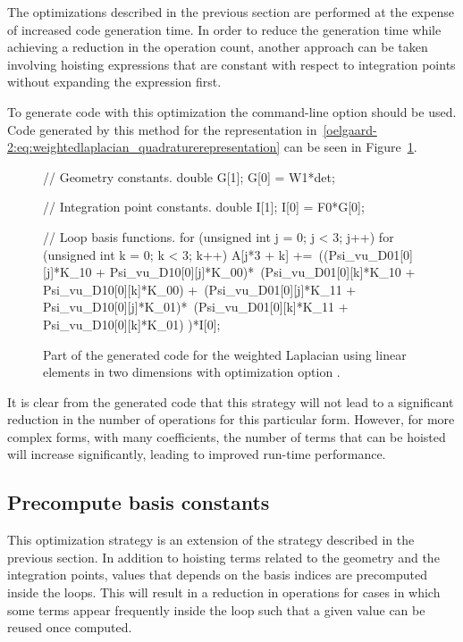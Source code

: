The optimizations described in the previous section are performed at
the expense of increased code generation time.  In order to reduce the
generation time while achieving a reduction in the operation count,
another approach can be taken involving hoisting expressions that are
constant with respect to integration points without expanding the
expression first.

To generate code with this optimization the \ffc{} command-line option
 should be used.  Code generated by this
method for the representation
in~\eqref{oelgaard-2:eq:weightedlaplacian_quadraturerepresentation}
can be seen in Figure~\ref{oelgaard-2:fig:O_ip_code}.

\begin{figure}
\begin{c++}
// Geometry constants.
double G[1];
G[0] = W1*det;

// Integration point constants.
double I[1];
I[0] = F0*G[0];

// Loop basis functions.
for (unsigned int j = 0; j < 3; j++)
{
  for (unsigned int k = 0; k < 3; k++)
  {
    A[j*3 + k] +=\
    ((Psi_vu_D01[0][j]*K_10 + Psi_vu_D10[0][j]*K_00)*\
     (Psi_vu_D01[0][k]*K_10 + Psi_vu_D10[0][k]*K_00) +\
     (Psi_vu_D01[0][j]*K_11 + Psi_vu_D10[0][j]*K_01)*\
     (Psi_vu_D01[0][k]*K_11 + Psi_vu_D10[0][k]*K_01)
    )*I[0];
  }
}
\end{c++}
\caption{Part of the generated code for the weighted Laplacian using
  linear elements in two dimensions with optimization option .}
\label{oelgaard-2:fig:O_ip_code}
\end{figure}

It is clear from the generated code that this strategy will not lead
to a significant reduction in the number of operations for this
particular form. However, for more complex forms, with many
coefficients, the number of terms that can be hoisted will increase
significantly, leading to improved run-time performance.

\subsection{Precompute basis constants}

This optimization strategy is an extension of the strategy described
in the previous section. In addition to hoisting terms related to the
geometry and the integration points, values that depends on the basis
indices are precomputed inside the loops.  This will result in a
reduction in operations for cases in which some terms appear
frequently inside the loop such that a given value can be reused once
computed.

